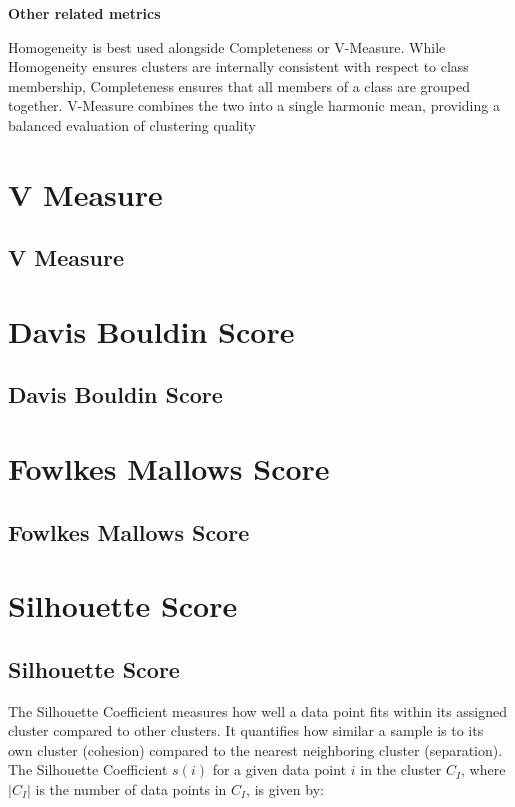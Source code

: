 \clearpage

\thispagestyle{customstyle}

\textbf{Other related metrics}

Homogeneity is best used alongside Completeness or V-Measure. While Homogeneity ensures clusters are internally consistent with
respect to class membership, Completeness ensures that all members of a class are grouped together. V-Measure combines the two
into a single harmonic mean, providing a balanced evaluation of clustering quality

\clearpage
\thispagestyle{clusteringstyle}
\section{V Measure}
\subsection{V Measure}

\clearpage
\thispagestyle{clusteringstyle}
\section{Davis Bouldin Score}
\subsection{Davis Bouldin Score}

\clearpage
\thispagestyle{clusteringstyle}
\section{Fowlkes Mallows Score}
\subsection{Fowlkes Mallows Score}

\clearpage
\thispagestyle{clusteringstyle}
\section{Silhouette Score}
\subsection{Silhouette Score}

The Silhouette Coefficient measures how well a data point fits within its assigned cluster compared to other clusters. 
It quantifies how similar a sample is to its own cluster (cohesion) compared to the nearest neighboring cluster (separation).
The Silhouette Coefficient $s(i)$ for a given data point $i$ in the cluster $C_I$, where $|C_I|$ is the number of data points in $C_I$, is given by:

